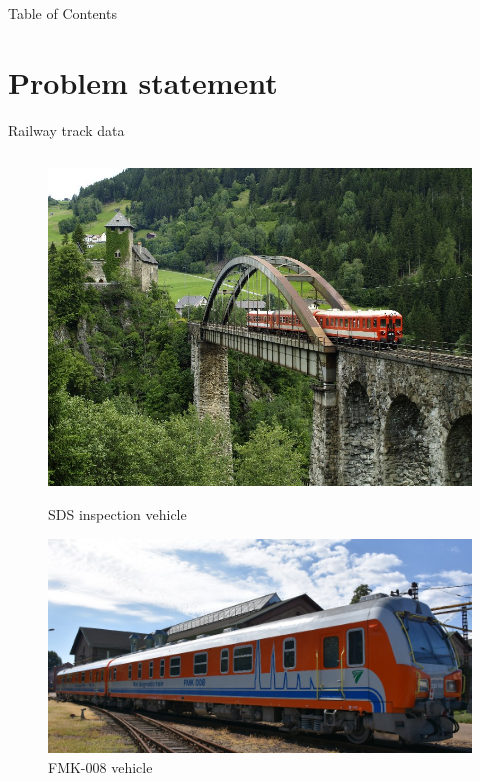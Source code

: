 \documentclass[aspectratio=169]{beamer}
\begin{document}
\begin{frame}{Table of Contents}
    \tableofcontents
\end{frame}

\section{Problem statement}
\begin{frame}{Railway track data}
    \begin{columns}[c]
        \begin{column}{0.25\textwidth}
            \begin{figure}
                \raggedright
                \includegraphics[width=\columnwidth]{./tex_images/sds.jpg}
                \caption*{SDS inspection vehicle}
                \includegraphics[width=\columnwidth]{./tex_images/FMK008.jpg}
                \caption*{FMK-008 vehicle}
            \end{figure}
        \end{column}

\end{columns}
\end{frame}
\end{document}
